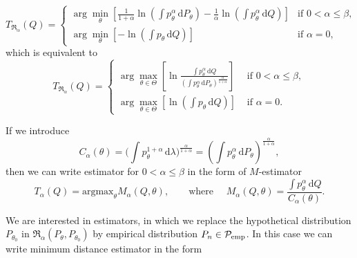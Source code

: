 \begin{equation}
	T_{\mathfrak{R}_\alpha}(Q) =
	\begin{cases}
		 \arg \min_{\theta} \left[\frac{1}{1+\alpha} \ln(\int p_\theta^\alpha\, \mathrm{d}P_\theta) - \frac{1}{\alpha} \ln(\int p_\theta^\alpha\, \mathrm{d}Q) \right] & \text{if } 0 < \alpha \leq \beta, \\
		 \arg \min_{\theta} \left[- \ln(\int p_\theta\, \mathrm{d}Q) \right] & \text{if } \alpha = 0,
	\end{cases}	
\end{equation}
which is equivalent to 
\begin{equation}
	T_{\mathfrak{R}_\alpha}(Q) = 
	\begin{cases}
		 \displaystyle{ \arg \max_{\theta \in \Theta} \left[\ln\frac{\int p_\theta^\alpha\, \mathrm{d}Q}{(\int p_\theta^\alpha\, \mathrm{d}P_\theta)^{\frac{\alpha}{1+\alpha}}} \right] }& \text{ if } 0 < \alpha \leq \beta, \\[5mm]
		 \displaystyle{ \arg \max_{\theta \in \Theta} \left[\ln(\int p_\theta\, \mathrm{d}Q) \right] }& \text{ if } \alpha = 0.
	\end{cases}	
\end{equation}

If we introduce
\begin{equation}
C_{\alpha}(\theta) = \biggl(\int p_{\theta}^{1+\alpha} \, \mathrm{d}\lambda\biggr)^{\frac{\alpha}{1+\alpha}} = \left( \int p_\theta^\alpha\, \mathrm{d}P_\theta \right)^{\frac{\alpha}{1+\alpha}},
\end{equation}
then we can write \ren estimator for $0<\alpha \leq \beta$ in the form of $M$-estimator
\begin{equation}
T_{\alpha}(Q) = \text{argmax}_{\theta} M_{\alpha}(Q,\theta), \qquad \text{where } \quad M_{\alpha}(Q,\theta) = \frac{\int p_{\theta}^{\alpha}\, \mathrm{d}Q}{C_{\alpha}(\theta)}.
\end{equation}

We are interested in estimators, in which we replace the hypothetical distribution $P_{\theta_0}$ in $\mathfrak{R}_\alpha(P_\theta, P_{\theta_0})$ by empirical distribution $P_n \in \mathcal{P}_\mathrm{emp}$. In this case we can write minimum \ren distance estimator in the form


